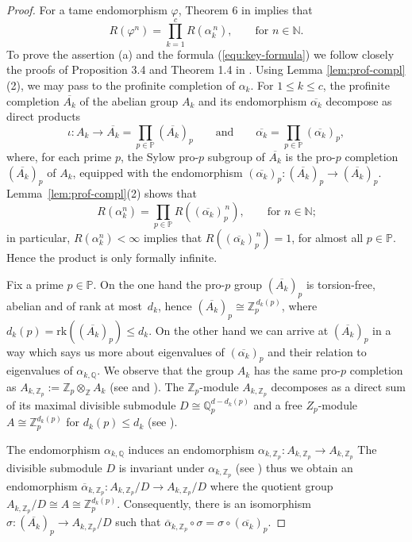 \documentclass[12pt, a4paper]{amsart}
\def\a{\alpha}
\def\Z{{\mathbb Z}}
\def\Q{{\mathbb Q}}
\begin{document}
\begin{proof}
 For a tame endomorphism $\varphi$, Theorem 6 in \cite{polyc} implies that
 $$
   R(\varphi^n)= \prod_{k=1}^c R(\a_k^{\, n}), \qquad \text{for $n \in \mathbb{N}$.}
 $$
 To prove the assertion (a) and the formula  (\ref{equ:key-formula})
 we follow closely the proofs of Proposition 3.4 and Theorem 1.4 in \cite{FelsKlop}.
 Using Lemma \ref{lem:prof-compl}(2), we
 may pass to the profinite completion of $\alpha_k$.
 For $1 \le k \le c$, the profinite completion $\overline{A_k}$ of the abelian group $A_k$ and its
 endomorphism $\overline{\a_k}$ decompose as direct products
 \[
 \iota \colon A_k \to \overline{A_k} = \prod_{p \in \mathbb{P}}
 (\overline{A_k})_p \qquad \text{and} \qquad \overline{\a_k} = \prod_{p
   \in \mathbb{P}} (\overline{\a_k})_p,
 \]
 where, for each prime $p$, the Sylow pro-$p$ subgroup of
 $\overline{A_k}$ is the pro-$p$ completion $(\overline{A_k})_p$
 of $A_k$, equipped with the endomorphism
 $(\overline{\a_k})_p \colon (\overline{A_k})_p \to
 (\overline{A_k})_p$. Lemma~\ref{lem:prof-compl}(2) shows that
 $$
 R(\a_k^n) = \prod_{p \in \mathbb{P}}
 R((\overline{\a_k})_p^{\, n}), \qquad
 \text{for $n \in \mathbb{N}$;}
 $$
 in particular, $R(\a_k^n) < \infty$ implies that
 $R((\overline{\a_k})_p^{\, n}) = 1$, for
 almost all $p \in \mathbb{P}$.  Hence the product is only formally
 infinite.

 Fix a prime $p \in \mathbb{P}$.
 On the one hand the pro-$p$ group $(\overline{A_k})_p$ is
 torsion-free, abelian and of rank at most~$d_k$, hence
 $(\overline{A_k})_p \cong \mathbb{Z}_p^{\, d_k(p)}$, where
 $d_k(p) = \mathrm{rk}((\overline{A_k})_p) \le d_k$.
 On the other hand we can arrive at $(\overline{A_k})_p$ in a way which says us more
 about eigenvalues of $(\overline{\a_k})_p$ and their relation to eigenvalues of $\alpha_{k, \Q}$.
 We observe that the group $A_k$ has the same pro-$p$ completion as $A_{k,\Z_p} := \Z_p \otimes_{\Z} A_k$
 (see \cite{FelsKlop} and \cite{RibZal}).
 The $\Z_p$-module $A_{k,\Z_p}$ decomposes as a direct sum of its maximal divisible submodule
 $D \cong \Q_p^{d-d_k(p)}$ and a free $Z_p$-module $A \cong \Z_p^{d_k(p)}$ for $d_k(p) \leq d_k$
 (see \cite[Theorem 20]{Kap}).

 The endomorphism $\alpha_{k,\Q}$ induces an endomorphism $\alpha_{k,\Z_p}: A_{k,\Z_p} \to A_{k,\Z_p}$
 The divisible submodule $D$ is invariant under $\alpha_{k,\Z_p}$ (see \cite[Chapter 5]{Kap})
 thus we obtain an endomorphism $\overline{\alpha}_{k,\Z_p}: A_{k,\Z_p}/D \to A_{k,\Z_p}/D$
 where the quotient group $A_{k,\Z_p}/D \cong A \cong \Z_p^{d_k(p)}$.
 Consequently, there is an isomorphism $\sigma: (\overline{A_k})_p \to A_{k,\Z_p}/D$ such that
 $\overline{\alpha}_{k,\Z_p} \circ \sigma = \sigma \circ (\overline{\a_k})_p$.


\end{proof}
\end{document}
